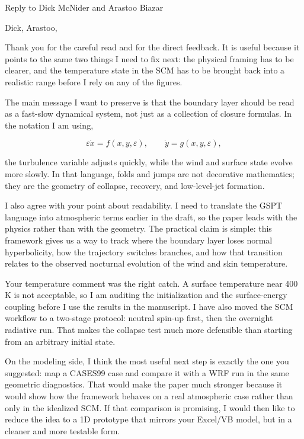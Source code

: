 \documentclass[11pt]{article}
\begin{document}
\begin{center}
{\LARGE Reply to Dick McNider and Arastoo Biazar}\par
\vspace{0.75em}
\end{center}

Dick, Arastoo,

Thank you for the careful read and for the direct feedback. It is useful because it points to the same two things I need to fix next: the physical framing has to be clearer, and the temperature state in the SCM has to be brought back into a realistic range before I rely on any of the figures.

The main message I want to preserve is that the boundary layer should be read as a fast-slow dynamical system, not just as a collection of closure formulas. In the notation I am using,

\[
\varepsilon \dot{x} = f(x,y,\varepsilon), \qquad \dot{y} = g(x,y,\varepsilon),
\]

the turbulence variable adjusts quickly, while the wind and surface state evolve more slowly. In that language, folds and jumps are not decorative mathematics; they are the geometry of collapse, recovery, and low-level-jet formation.

I also agree with your point about readability. I need to translate the GSPT language into atmospheric terms earlier in the draft, so the paper leads with the physics rather than with the geometry. The practical claim is simple: this framework gives us a way to track where the boundary layer loses normal hyperbolicity, how the trajectory switches branches, and how that transition relates to the observed nocturnal evolution of the wind and skin temperature.

Your temperature comment was the right catch. A surface temperature near 400 K is not acceptable, so I am auditing the initialization and the surface-energy coupling before I use the results in the manuscript. I have also moved the SCM workflow to a two-stage protocol: neutral spin-up first, then the overnight radiative run. That makes the collapse test much more defensible than starting from an arbitrary initial state.

On the modeling side, I think the most useful next step is exactly the one you suggested: map a CASES99 case and compare it with a WRF run in the same geometric diagnostics. That would make the paper much stronger because it would show how the framework behaves on a real atmospheric case rather than only in the idealized SCM. If that comparison is promising, I would then like to reduce the idea to a 1D prototype that mirrors your Excel/VB model, but in a cleaner and more testable form.
\end{document}
